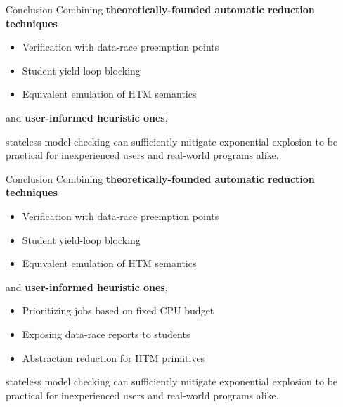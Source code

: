 \documentclass[xcolor=dvipsnames]{beamer}
\newcommand\hilight[2]{\color{#1}#2\color{black}}
\begin{document}
\begin{frame}{Conclusion}
	Combining %
	{\bf theoretically-founded automatic reduction techniques}
	\begin{itemize}
		\item \hilight{sect-quicksand}{Verification with data-race preemption points}
		\item \hilight{sect-410}{Student yield-loop blocking} %
		\item \hilight{sect-htm}{Equivalent emulation of HTM semantics}
	\end{itemize}
	and {\bf user-informed heuristic ones},
	\vspace{4.82em}
	\linegap

	\hilight{gray}{stateless model checking}\xspace
	\hilight{sect-pastel-quicksand}{can sufficiently mitigate exponential explosion}\xspace
	\hilight{sect-pastel-410}{to be practical for inexperienced users}\xspace
	\hilight{sect-pastel-htm}{and real-world programs alike.}\xspace
\end{frame}
\begin{frame}{Conclusion}
	Combining %
	{\bf theoretically-founded automatic reduction techniques}
	\begin{itemize}
		\item \hilight{sect-quicksand}{Verification with data-race preemption points}
		\item \hilight{sect-410}{Student yield-loop blocking} %
		\item \hilight{sect-htm}{Equivalent emulation of HTM semantics}
	\end{itemize}
	and {\bf user-informed heuristic ones},
	\begin{itemize}
		\item \hilight{sect-quicksand}{Prioritizing jobs based on fixed CPU budget}
		\item \hilight{sect-410}{Exposing data-race reports to students}
		\item \hilight{sect-htm}{Abstraction reduction for HTM primitives}
	\end{itemize}
	\linegap

	\hilight{gray}{stateless model checking}\xspace
	\hilight{sect-pastel-quicksand}{can sufficiently mitigate exponential explosion}\xspace
	\hilight{sect-pastel-410}{to be practical for inexperienced users}\xspace
	\hilight{sect-pastel-htm}{and real-world programs alike.}\xspace
\end{frame}
\end{document}
